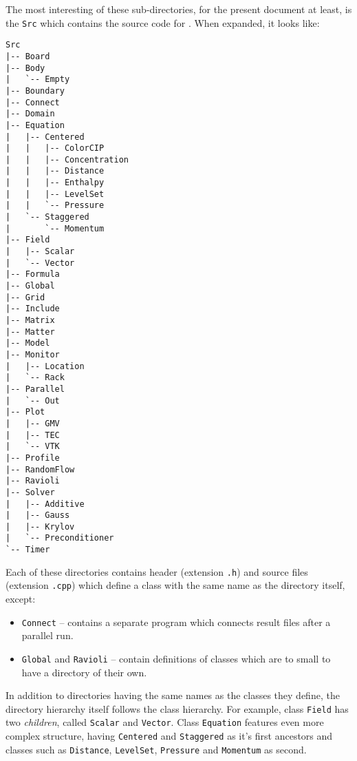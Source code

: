 The most interesting of these sub-directories, for the present document at least,
is the {\tt Src} which contains the source code for {\psiboil}. When expanded, 
it looks like:
%
{\small \begin{verbatim}
Src
|-- Board
|-- Body
|   `-- Empty
|-- Boundary
|-- Connect
|-- Domain
|-- Equation
|   |-- Centered
|   |   |-- ColorCIP
|   |   |-- Concentration
|   |   |-- Distance
|   |   |-- Enthalpy
|   |   |-- LevelSet
|   |   `-- Pressure
|   `-- Staggered
|       `-- Momentum
|-- Field
|   |-- Scalar
|   `-- Vector
|-- Formula
|-- Global
|-- Grid
|-- Include
|-- Matrix
|-- Matter
|-- Model
|-- Monitor
|   |-- Location
|   `-- Rack
|-- Parallel
|   `-- Out
|-- Plot
|   |-- GMV
|   |-- TEC
|   `-- VTK
|-- Profile
|-- RandomFlow
|-- Ravioli
|-- Solver
|   |-- Additive
|   |-- Gauss
|   |-- Krylov
|   `-- Preconditioner
`-- Timer
\end{verbatim}}
%
Each of these directories contains header (extension {\tt .h}) and source files 
(extension {\tt .cpp}) which define a class with the same name as the directory 
itself, except:
%
\begin{itemize}
  \item {\tt Connect} -- contains a separate program which connects result files 
        after a parallel run.
  \item {\tt Global} and {\tt Ravioli} -- contain definitions of classes which 
        are to small to have a directory of their own. 
\end{itemize}
%
In addition to directories having the same names as the classes they define,
the directory hierarchy itself follows the class hierarchy. For example, class
{\tt Field} has two {\em children}, called {\tt Scalar} and {\tt Vector}. 
Class {\tt Equation} features even more complex structure, having {\tt Centered}
and {\tt Staggered} as it's first ancestors and classes such as {\tt Distance},
{\tt LevelSet}, {\tt Pressure} and {\tt Momentum} as second. 

